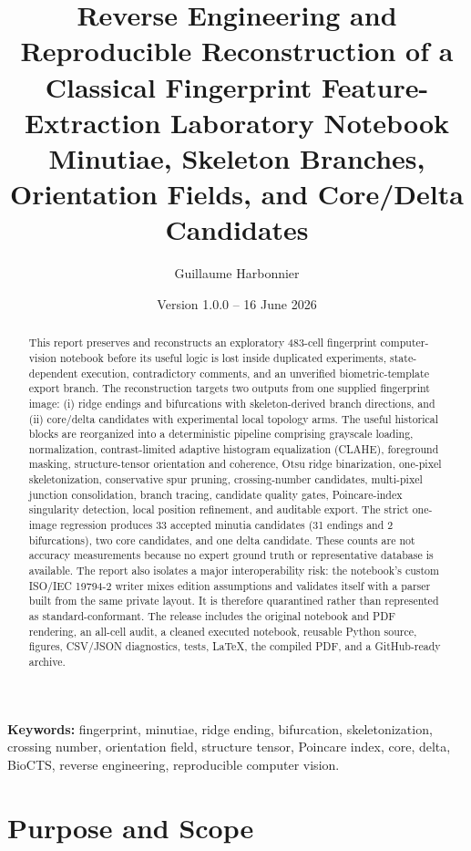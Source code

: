 \documentclass[11pt]{article}
\title{\textbf{Reverse Engineering and Reproducible Reconstruction of a Classical Fingerprint Feature-Extraction Laboratory Notebook}\\[0.35em]
\large Minutiae, Skeleton Branches, Orientation Fields, and Core/Delta Candidates}
\author[1]{Guillaume Harbonnier}
\affil[1]{Independent technical research and biometric computer-vision laboratory}
\date{Version 1.0.0 -- 16 June 2026}
\begin{document}
\maketitle

\begin{abstract}
This report preserves and reconstructs an exploratory 483-cell fingerprint computer-vision notebook before its useful logic is lost inside duplicated experiments, state-dependent execution, contradictory comments, and an unverified biometric-template export branch. The reconstruction targets two outputs from one supplied fingerprint image: (i) ridge endings and bifurcations with skeleton-derived branch directions, and (ii) core/delta candidates with experimental local topology arms. The useful historical blocks are reorganized into a deterministic pipeline comprising grayscale loading, normalization, contrast-limited adaptive histogram equalization (CLAHE), foreground masking, structure-tensor orientation and coherence, Otsu ridge binarization, one-pixel skeletonization, conservative spur pruning, crossing-number candidates, multi-pixel junction consolidation, branch tracing, candidate quality gates, Poincare-index singularity detection, local position refinement, and auditable export. The strict one-image regression produces 33 accepted minutia candidates (31 endings and 2 bifurcations), two core candidates, and one delta candidate. These counts are not accuracy measurements because no expert ground truth or representative database is available. The report also isolates a major interoperability risk: the notebook's custom ISO/IEC 19794-2 writer mixes edition assumptions and validates itself with a parser built from the same private layout. It is therefore quarantined rather than represented as standard-conformant. The release includes the original notebook and PDF rendering, an all-cell audit, a cleaned executed notebook, reusable Python source, figures, CSV/JSON diagnostics, tests, LaTeX, the compiled PDF, and a GitHub-ready archive.
\end{abstract}

\noindent\textbf{Keywords:} fingerprint, minutiae, ridge ending, bifurcation, skeletonization, crossing number, orientation field, structure tensor, Poincare index, core, delta, BioCTS, reverse engineering, reproducible computer vision.

\section{Purpose and Scope}
\end{document}
